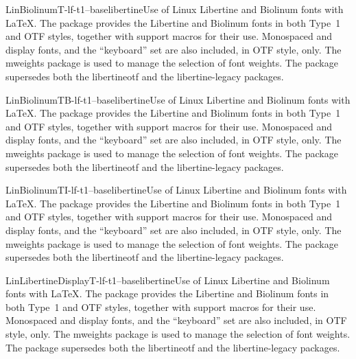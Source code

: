 \documentclass{ddltxtyp}
\begin{document}
\begin{package}{LinBiolinumT-lf-t1--base}{libertine}{Use of Linux Libertine and Biolinum fonts with {\LaTeX}.}
The package provides the Libertine and Biolinum fonts in both
Type~1 and OTF styles, together with support macros for their
use. Monospaced and display fonts, and the ``keyboard'' set are
also included, in OTF style, only. The mweights package is used
to manage the selection of font weights. The package supersedes
both the libertineotf and the libertine-legacy packages.
\end{package}
\begin{package}{LinBiolinumTB-lf-t1--base}{libertine}{Use of Linux Libertine and Biolinum fonts with {\LaTeX}.}
The package provides the Libertine and Biolinum fonts in both
Type~1 and OTF styles, together with support macros for their
use. Monospaced and display fonts, and the ``keyboard'' set are
also included, in OTF style, only. The mweights package is used
to manage the selection of font weights. The package supersedes
both the libertineotf and the libertine-legacy packages.
\end{package}
\begin{package}{LinBiolinumTI-lf-t1--base}{libertine}{Use of Linux Libertine and Biolinum fonts with {\LaTeX}.}
The package provides the Libertine and Biolinum fonts in both
Type~1 and OTF styles, together with support macros for their
use. Monospaced and display fonts, and the ``keyboard'' set are
also included, in OTF style, only. The mweights package is used
to manage the selection of font weights. The package supersedes
both the libertineotf and the libertine-legacy packages.
\end{package}
\begin{package}{LinLibertineDisplayT-lf-t1--base}{libertine}{Use of Linux Libertine and Biolinum fonts with {\LaTeX}.}
The package provides the Libertine and Biolinum fonts in both
Type~1 and OTF styles, together with support macros for their
use. Monospaced and display fonts, and the ``keyboard'' set are
also included, in OTF style, only. The mweights package is used
to manage the selection of font weights. The package supersedes
both the libertineotf and the libertine-legacy packages.
\end{package}
\end{document}
